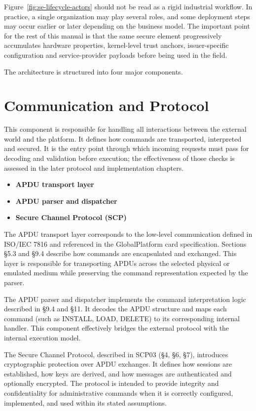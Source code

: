 Figure~\ref{fig:se-lifecycle-actors} should not be read as a rigid industrial
workflow. In practice, a single organization may play several roles, and some
deployment steps may occur earlier or later depending on the business model.
The important point for the rest of this manual is that the same secure element
progressively accumulates hardware properties, kernel-level trust anchors,
issuer-specific configuration and service-provider payloads before being used
in the field.

The architecture is structured into four major components.

\section{Communication and Protocol}

This component is responsible for handling all interactions between the
external world and the platform. It defines how commands are transported,
interpreted and secured. It is the entry point through which incoming requests
must pass for decoding and validation before execution;
the effectiveness of those checks is assessed in the later protocol and
implementation chapters.

\begin{itemize}
\item \textbf{APDU transport layer} 
\item \textbf{APDU parser and dispatcher} 
\item \textbf{Secure Channel Protocol (SCP)} 
\end{itemize}

The APDU transport layer corresponds to the low-level communication defined in
ISO/IEC 7816 and referenced in the GlobalPlatform card specification. Sections
§5.3 and §9.4 describe how commands are encapsulated and exchanged. This layer
is responsible for transporting APDUs across the selected physical or emulated
medium while preserving the command representation expected by the parser.

The APDU parser and dispatcher implements the command interpretation logic
described in §9.4 and §11. It decodes the APDU structure and maps each command
(such as INSTALL, LOAD, DELETE) to its corresponding internal handler. This
component effectively bridges the external protocol with the internal execution
model.

The Secure Channel Protocol, described in SCP03 (§4, §6, §7), introduces
cryptographic protection over APDU exchanges. It defines how sessions are
established, how keys are derived, and how messages are authenticated and
optionally encrypted. The protocol is intended to provide integrity and
confidentiality for administrative commands when it is correctly configured,
implemented, and used within its stated assumptions.


